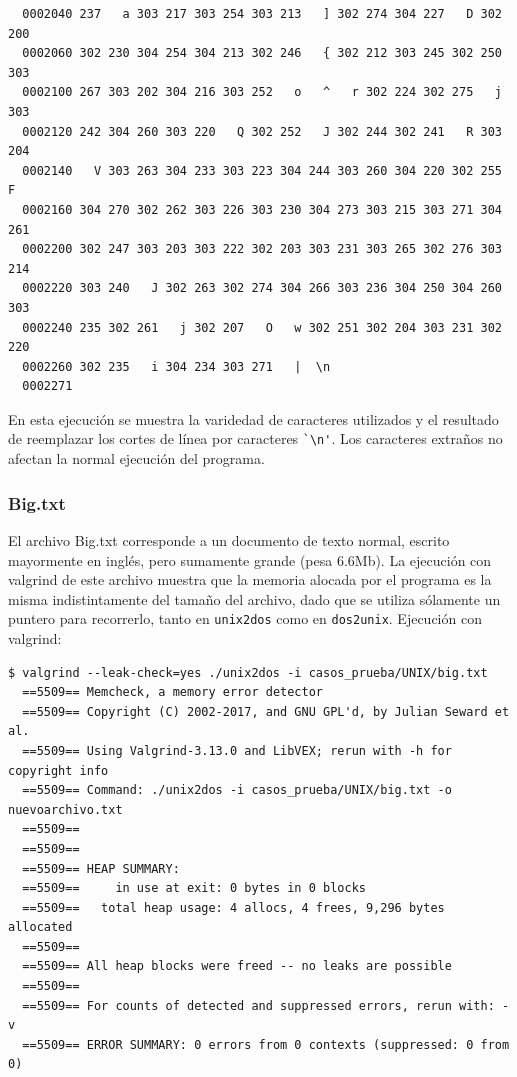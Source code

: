\documentclass[a4paper,10pt, spanish]{article}
\begin{document}
\begin{lstlisting}
  0002040 237   a 303 217 303 254 303 213   ] 302 274 304 227   D 302 200
  0002060 302 230 304 254 304 213 302 246   { 302 212 303 245 302 250 303
  0002100 267 303 202 304 216 303 252   o   ^   r 302 224 302 275   j 303
  0002120 242 304 260 303 220   Q 302 252   J 302 244 302 241   R 303 204
  0002140   V 303 263 304 233 303 223 304 244 303 260 304 220 302 255   F
  0002160 304 270 302 262 303 226 303 230 304 273 303 215 303 271 304 261
  0002200 302 247 303 203 303 222 302 203 303 231 303 265 302 276 303 214
  0002220 303 240   J 302 263 302 274 304 266 303 236 304 250 304 260 303
  0002240 235 302 261   j 302 207   O   w 302 251 302 204 303 231 302 220
  0002260 302 235   i 304 234 303 271   |  \n
  0002271  
\end{lstlisting}
En esta ejecución se muestra la varidedad de caracteres utilizados y el resultado 
de reemplazar los cortes de línea por caracteres \lstinline{`\n'}. Los caracteres extraños
no afectan la normal ejecución del programa.
\subsubsection{Big.txt}
El archivo Big.txt corresponde a un documento de texto normal, escrito mayormente en inglés, pero sumamente
grande (pesa 6.6Mb).
La ejecución con valgrind de este archivo muestra que la memoria alocada por el programa es la misma
indistintamente del tamaño del archivo, dado que se utiliza sólamente un puntero para recorrerlo, tanto en
\lstinline{unix2dos} como en \lstinline{dos2unix}.
Ejecución con valgrind:
\begin{lstlisting}
$ valgrind --leak-check=yes ./unix2dos -i casos_prueba/UNIX/big.txt
  ==5509== Memcheck, a memory error detector
  ==5509== Copyright (C) 2002-2017, and GNU GPL'd, by Julian Seward et al.
  ==5509== Using Valgrind-3.13.0 and LibVEX; rerun with -h for copyright info
  ==5509== Command: ./unix2dos -i casos_prueba/UNIX/big.txt -o nuevoarchivo.txt
  ==5509== 
  ==5509== 
  ==5509== HEAP SUMMARY:
  ==5509==     in use at exit: 0 bytes in 0 blocks
  ==5509==   total heap usage: 4 allocs, 4 frees, 9,296 bytes allocated
  ==5509== 
  ==5509== All heap blocks were freed -- no leaks are possible
  ==5509== 
  ==5509== For counts of detected and suppressed errors, rerun with: -v
  ==5509== ERROR SUMMARY: 0 errors from 0 contexts (suppressed: 0 from 0)  
\end{lstlisting}
\end{document}
